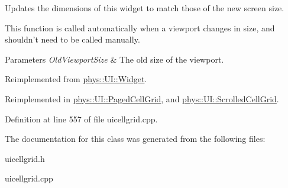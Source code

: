 Updates the dimensions of this widget to match those of the new screen size. 

This function is called automatically when a viewport changes in size, and shouldn't need to be called manually. 
\begin{DoxyParams}{Parameters}
{\em OldViewportSize} & The old size of the viewport. \\
\hline
\end{DoxyParams}


Reimplemented from \hyperlink{classphys_1_1UI_1_1Widget_acbda7003549c6caac46078c034657929}{phys::UI::Widget}.



Reimplemented in \hyperlink{classphys_1_1UI_1_1PagedCellGrid_a7d6ddd7126f86d2ea6592ac3f9a91037}{phys::UI::PagedCellGrid}, and \hyperlink{classphys_1_1UI_1_1ScrolledCellGrid_aed1f61cbdab04c555e26076ec933bbf2}{phys::UI::ScrolledCellGrid}.



Definition at line 557 of file uicellgrid.cpp.



The documentation for this class was generated from the following files:\begin{DoxyCompactItemize}
\item 
uicellgrid.h\item 
uicellgrid.cpp\end{DoxyCompactItemize}
